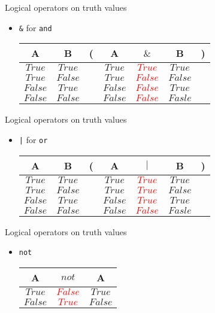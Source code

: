 \documentclass{beamer}
\begin{document}
\begin{slide}{
\item Logical operators on truth values
\begin{itemize}
\item \texttt{\&} for \texttt{and}
\\
\begin{tabular}{@{ }c@{ }@{ }c | c@{}@{ }c@{ }@{ }c@{ }@{ }c@{ }@{}c@{ }}
A & B & ( & A & $\&$ & B & )\\
\hline 
$True$ & $True$ &  & $True$ & \textcolor{red}{$True$} & $True$ & \\
$True$ & $False$ &  & $True$ & \textcolor{red}{$False$} & $False$ & \\
$False$ & $True$ &  & $False$ & \textcolor{red}{$False$} & $True$ & \\
$False$ & $False$ &  & $False$ & \textcolor{red}{$False$} & $Fasle$ & \\
\end{tabular}
\end{itemize}
}\end{slide}

\begin{slide}{
\item Logical operators on truth values
\begin{itemize}
\item \texttt{|} for \texttt{or}
\\
\begin{tabular}{@{ }c@{ }@{ }c | c@{}@{ }c@{ }@{ }c@{ }@{ }c@{ }@{}c@{ }}
A & B & ( & A & $|$ & B & )\\
\hline 
$True$ & $True$ &  & $True$ & \textcolor{red}{$True$} & $True$ & \\
$True$ & $False$ &  & $True$ & \textcolor{red}{$True$} & $False$ & \\
$False$ & $True$ &  & $False$ & \textcolor{red}{$True$} & $True$ & \\
$False$ & $False$ &  & $False$ & \textcolor{red}{$False$} & $Fasle$ & \\
\end{tabular}
\end{itemize}
}\end{slide}

\begin{slide}{
\item Logical operators on truth values
\begin{itemize}
\item \texttt{not}
\\
\begin{tabular}{@{ }c | c@{ }@{ }c}
A & $not$ & A\\
\hline 
$True$ & \textcolor{red}{$False$} & $True$\\
$False$ & \textcolor{red}{$True$} & $False$\\
\end{tabular}
\end{itemize}
}\end{slide}
\end{document}
